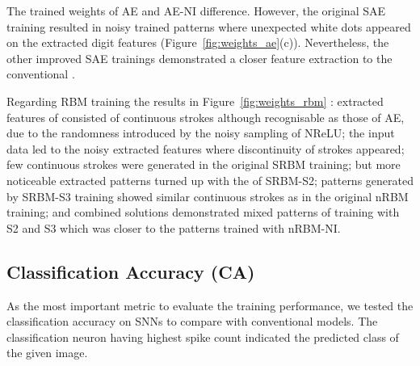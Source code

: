 The trained weights of AE and AE-NI \DIFdelbegin {}\DIFdelend \DIFaddbegin {}\DIFaddend difference.
However, the original SAE training resulted in noisy trained patterns where unexpected white dots appeared on the extracted digit features (Figure~\ref{fig:weights_ae}(c)).
Nevertheless, the other improved SAE trainings demonstrated a closer feature extraction to the conventional \DIFdelbegin {}\DIFdelend \DIFaddbegin {}\DIFaddend .



Regarding RBM training
the results in Figure~\ref{fig:weights_rbm} \DIFdelbegin {}\DIFdelend \DIFaddbegin {}\DIFaddend :
extracted features of \DIFdelbegin {}\DIFdelend \DIFaddbegin {}\DIFaddend consisted of continuous strokes although \DIFdelbegin {}\DIFdelend \DIFaddbegin {}\DIFaddend recognisable as those of \DIFaddbegin {}\DIFaddend AE, due to the randomness introduced by the noisy sampling of NReLU;
\DIFdelbegin {}\DIFdelend \DIFaddbegin {}\DIFaddend the input data led to the noisy extracted features where discontinuity of strokes appeared;
few continuous strokes were generated in the original SRBM training;
but more noticeable extracted patterns turned up with the \DIFdelbegin {}\DIFdelend \DIFaddbegin {}\DIFaddend of SRBM-S2;
patterns generated by SRBM-S3 training showed similar continuous strokes as in the original nRBM training;
and combined solutions demonstrated mixed patterns of training with S2 and S3 which was closer to the patterns trained with nRBM-NI. 


\subsection{Classification Accuracy (CA)}
As the most important metric to evaluate the training performance, we tested the classification accuracy on SNNs to compare with conventional models.
The classification neuron having \DIFdelbegin {}\DIFdelend \DIFaddbegin {}\DIFaddend highest spike count indicated the predicted class of the given image.

